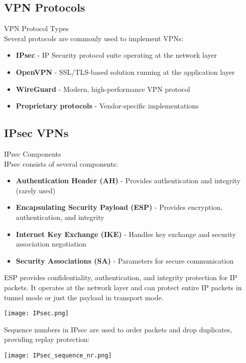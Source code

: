 \subsection{VPN Protocols}

\begin{definition}{VPN Protocol Types}\\
Several protocols are commonly used to implement VPNs:
\begin{itemize}
    \item \textbf{IPsec} - IP Security protocol suite operating at the network layer
    \item \textbf{OpenVPN} - SSL/TLS-based solution running at the application layer
    \item \textbf{WireGuard} - Modern, high-performance VPN protocol
    \item \textbf{Proprietary protocols} - Vendor-specific implementations
\end{itemize}
\end{definition}

\subsection{IPsec VPNs}

\begin{concept}{IPsec Components}\\
IPsec consists of several components:
\begin{itemize}
    \item \textbf{Authentication Header (AH)} - Provides authentication and integrity (rarely used)
    \item \textbf{Encapsulating Security Payload (ESP)} - Provides encryption, authentication, and integrity
    \item \textbf{Internet Key Exchange (IKE)} - Handles key exchange and security association negotiation
    \item \textbf{Security Associations (SA)} - Parameters for secure communication
\end{itemize}

ESP provides confidentiality, authentication, and integrity protection for IP packets. It operates at the network layer and can protect entire IP packets in tunnel mode or just the payload in transport mode.

\texttt{[image: IPsec.png]}

Sequence numbers in IPsec are used to order packets and drop duplicates, providing replay protection:

\texttt{[image: IPsec\_sequence\_nr.png]}
\end{concept}

